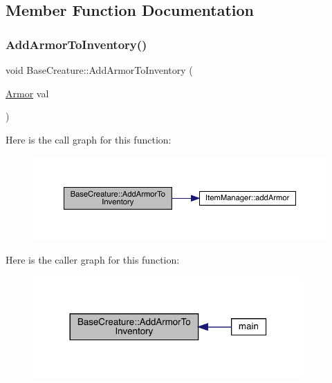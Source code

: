 \subsection{Member Function Documentation}
\mbox{\label{class_base_creature_a03122a2c070fe7cab0dc772f552f1a63}} 
\subsubsection{\texorpdfstring{Add\+Armor\+To\+Inventory()}{AddArmorToInventory()}}
{\footnotesize\ttfamily void Base\+Creature\+::\+Add\+Armor\+To\+Inventory (\begin{DoxyParamCaption}\item[{\mbox{\hyperlink{class_armor}{Armor}}}]{val }\end{DoxyParamCaption})}

Here is the call graph for this function\+:
\nopagebreak
\begin{figure}[H]
\begin{center}
\leavevmode
\includegraphics[width=350pt]{d2/d3b/class_base_creature_a03122a2c070fe7cab0dc772f552f1a63_cgraph}
\end{center}
\end{figure}
Here is the caller graph for this function\+:
\nopagebreak
\begin{figure}[H]
\begin{center}
\leavevmode
\includegraphics[width=293pt]{d2/d3b/class_base_creature_a03122a2c070fe7cab0dc772f552f1a63_icgraph}
\end{center}
\end{figure}
\mbox{\label{class_base_creature_ab6f0139afb4e1b15d5f1feecc267580d}} 
